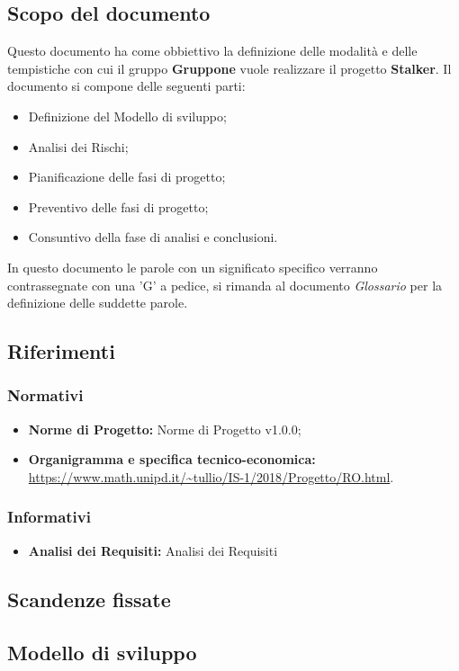 \documentclass[../piano-di-progetto.tex]{subfiles}
\begin{document}
\subsection{Scopo del documento}%
\label{sub:scopo_del_documento}
Questo documento ha come obbiettivo la definizione delle modalità e delle tempistiche con cui il gruppo \textbf{Gruppone} vuole realizzare il progetto \textbf{Stalker}.
Il documento si compone delle seguenti parti:
\begin{itemize}
  \item Definizione del Modello di sviluppo;
  \item Analisi dei Rischi;
  \item Pianificazione delle fasi di progetto;
  \item Preventivo delle fasi di progetto;
  \item Consuntivo della fase di analisi e conclusioni.
\end{itemize}
In questo documento le parole con un significato specifico verranno contrassegnate con una 'G' a pedice, si rimanda al documento \textit{Glossario} per la definizione delle suddette parole.
\subsection{Riferimenti}%
\label{sub:riferimenti}
\subsubsection{Normativi}%
\label{subs:normativi}
\begin{itemize}
  \item  \textbf{Norme di Progetto:} Norme di Progetto v1.0.0;
  \item  \textbf{Organigramma e specifica tecnico-economica:} \url{https://www.math.unipd.it/~tullio/IS-1/2018/Progetto/RO.html}.
\end{itemize}
\subsubsection{Informativi}
\begin{itemize}
  \item \textbf{Analisi dei Requisiti:} Analisi dei Requisiti
\end{itemize}%
\label{subs:informativi}
\subsection{Scandenze fissate}%
\label{subs:scadenze_fissate}
\subsection{Modello di sviluppo}%
\label{sub:modello_di_sviluppo}
\end{document}
